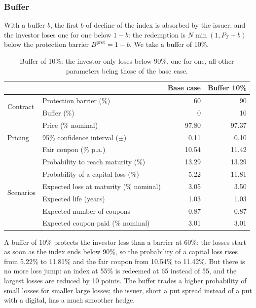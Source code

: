 \documentclass[11pt,a4paper]{article}
\begin{document}
\clearpage
\subsubsection{Buffer}

With a buffer $b$, the first $b$ of decline of the index is absorbed by the issuer, and the investor loses one for
one below $1 - b$: the redemption is $N \min(1, P_T + b)$ below the protection barrier $B^{\mathrm{prot}} = 1 - b$.
We take a buffer of 10\%.

\begin{table}[htbp]
  \centering
  \small
  \begin{tabular}{llrr}
    \toprule
     & & \textbf{Base case} & \textbf{Buffer 10\%} \\
    \midrule
    \multirow{2}{*}{Contract}
      & Protection barrier (\%) & 60 & 90 \\
      & Buffer (\%) & 0 & 10 \\
    \midrule
    \multirow{3}{*}{Pricing}
      & Price (\% nominal) & 97.80 & 97.37 \\
      & 95\% confidence interval ($\pm$) & 0.11 & 0.10 \\
      & Fair coupon (\% p.a.) & 10.54 & 11.42 \\
    \midrule
    \multirow{6}{*}{Scenarios}
      & Probability to reach maturity (\%) & 13.29 & 13.29 \\
      & Probability of a capital loss (\%) & 5.22 & 11.81 \\
      & Expected loss at maturity (\% nominal) & 3.05 & 3.50 \\
      & Expected life (years) & 1.03 & 1.03 \\
      & Expected number of coupons & 0.87 & 0.87 \\
      & Expected coupon paid (\% nominal) & 3.01 & 3.01 \\
    \bottomrule
  \end{tabular}
  \caption{Buffer of 10\%: the investor only loses below 90\%, one for one, all other parameters being those of the base case.}
  \label{tab:athena-buffer}
\end{table}

A buffer of 10\% protects the investor less than a barrier at 60\%: the losses start as soon as the index ends below
90\%, so the probability of a capital loss rises from 5.22\% to 11.81\% and the fair coupon from 10.54\% to 11.42\%.
But there is no more loss jump: an index at 55\% is redeemed at 65 instead of 55, and the largest losses are reduced
by 10 points. The buffer trades a higher probability of small losses for smaller large losses; the issuer, short a
put spread instead of a put with a digital, has a much smoother hedge.
\end{document}
